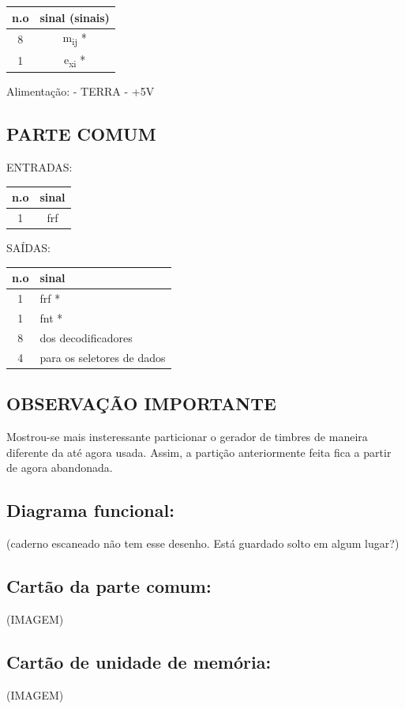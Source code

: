\documentclass{article}
\begin{document}
\begin{tabular}{|c|c|}
\hline
n.o & sinal (sinais) \\
\hline
8 & m\textsubscript{ij} * \\
1 & e\textsubscript{xi} * \\
\hline
\end{tabular}

Alimentação:
- TERRA
- +5V

\subsection{PARTE COMUM}

ENTRADAS:

\begin{tabular}{c|c}
n.o & sinal \\
\hline
1 & frf \\
\end{tabular}


SAÍDAS:

\begin{tabular}{c|l}
n.o & sinal \\
\hline
1 & frf * \\
1 & fnt * \\
8 & dos decodificadores \\
4 & para os seletores de dados \\
\end{tabular}


\subsection{OBSERVAÇÃO IMPORTANTE}
Mostrou-se mais insteressante particionar o gerador de timbres de maneira diferente da até agora usada. Assim, a partição anteriormente feita fica a partir de agora abandonada.

\subsection{Diagrama funcional:}
(caderno escaneado não tem esse desenho. Está guardado solto em algum lugar?)


\subsection{Cartão da parte comum:}
(IMAGEM)

\subsection{Cartão de unidade de memória:}
(IMAGEM)
\end{document}
